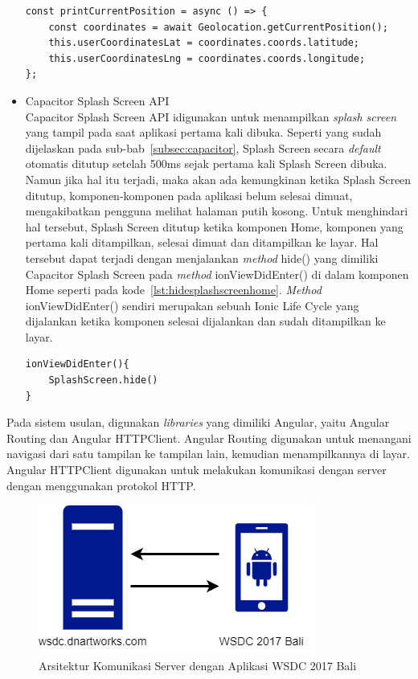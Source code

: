 \begin{itemize}
\begin{lstlisting}[label={lst:getposisipenggunageolocation}, caption=\textit{Method} getCurrentPosition( Pada Geolocation API]
const printCurrentPosition = async () => {
	const coordinates = await Geolocation.getCurrentPosition();
    this.userCoordinatesLat = coordinates.coords.latitude;
    this.userCoordinatesLng = coordinates.coords.longitude;
};
\end{lstlisting}
	 
	 \item Capacitor Splash Screen API \\
	 Capacitor Splash Screen API idigunakan untuk menampilkan \textit{splash screen} yang tampil pada saat aplikasi pertama kali dibuka. Seperti yang sudah dijelaskan pada sub-bab~\ref{subsec:capacitor}, Splash Screen secara \textit{default} otomatis ditutup setelah 500ms sejak pertama kali Splash Screen dibuka. Namun jika hal itu terjadi, maka akan ada kemungkinan ketika Splash Screen ditutup, komponen-komponen pada aplikasi belum selesai dimuat, mengakibatkan pengguna melihat halaman putih kosong. Untuk menghindari hal tersebut, Splash Screen ditutup ketika komponen Home, komponen yang pertama kali ditampilkan, selesai dimuat dan ditampilkan ke layar. Hal tersebut dapat terjadi dengan menjalankan \textit{method} hide() yang dimiliki Capacitor Splash Screen pada \textit{method} ionViewDidEnter() di dalam komponen Home seperti pada kode~\ref{lst:hidesplashscreenhome}. \textit{Method} ionViewDidEnter() sendiri merupakan sebuah Ionic Life Cycle yang dijalankan ketika komponen selesai dijalankan dan sudah ditampilkan ke layar. 
	 
\begin{lstlisting}[label={lst:hidesplashscreenhome}, caption=\textit{Method} hide() Pada Splash Screen API]
ionViewDidEnter(){
	SplashScreen.hide()
}
\end{lstlisting}

\end{itemize}

Pada sistem usulan, digunakan \textit{libraries} yang dimiliki Angular, yaitu Angular Routing dan Angular HTTPClient. Angular Routing digunakan untuk menangani navigasi dari satu tampilan ke tampilan lain, kemudian menampilkannya di layar.  Angular HTTPClient digunakan untuk melakukan komunikasi dengan server dengan menggunakan protokol HTTP.

\begin{figure}[H]
		\centering
	    \includegraphics[scale=0.5]{Gambar/httpclientserver.png}
	    \caption{Arsitektur Komunikasi Server dengan Aplikasi WSDC 2017 Bali}
	    \label{fig:arsitekturhttpclient}
\end{figure}

